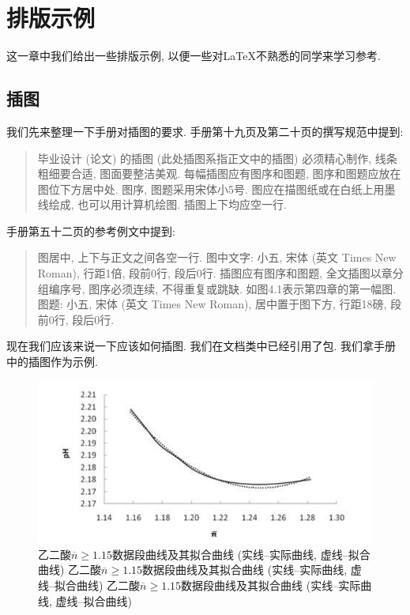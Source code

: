 
\section{排版示例}

这一章中我们给出一些排版示例, 以便一些对\LaTeX 不熟悉的同学来学习参考.

\subsection{插图}

我们先来整理一下手册对插图的要求. 手册第十九页及第二十页的撰写规范中提到:
\begin{quote}
  毕业设计 (论文) 的插图 (此处插图系指正文中的插图) 必须精心制作, 线条粗细要合适, 图面要整洁美观. 每幅插图应有图序和图题, 图序和图题应放在图位下方居中处. 图序, 图题采用宋体小5号. 图应在描图纸或在白纸上用墨线绘成, 也可以用计算机绘图. 插图上下均应空一行.
\end{quote}
手册第五十二页的参考例文中提到:
\begin{quote}
  图居中, 上下与正文之间各空一行.
  图中文字: 小五, 宋体 (英文 Times New Roman), 行距1倍, 段前0行, 段后0行.
  插图应有图序和图题, 全文插图以章分组编序号, 图序必须连续, 不得重复或跳缺. 如图4.1表示第四章的第一幅图.
  图题: 小五, 宋体 (英文 Times New Roman), 居中置于图下方, 行距18磅, 段前0行, 段后0行.
\end{quote}

现在我们应该来说一下应该如何插图. 我们在文档类中已经引用了包. 我们拿手册中的插图作为示例.

\begin{figure}[htb]
  \centering
  \includegraphics{figures/oxalic-acid-n-geq-1.15.pdf}
  \caption{乙二酸$\overline{n}\geq 1.15$数据段曲线及其拟合曲线 (实线--实际曲线, 虚线--拟合曲线) 乙二酸$\overline{n}\geq 1.15$数据段曲线及其拟合曲线 (实线--实际曲线, 虚线--拟合曲线) 乙二酸$\overline{n}\geq 1.15$数据段曲线及其拟合曲线 (实线--实际曲线, 虚线--拟合曲线)}
\end{figure}

\zhlipsum[1]
